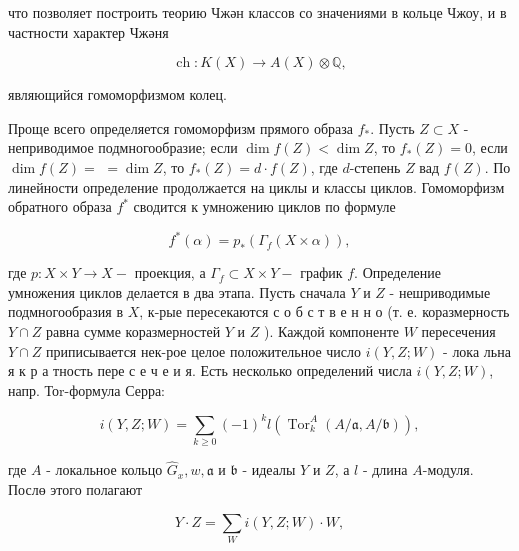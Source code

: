 \documentclass[10pt]{article}
\begin{document}
что позволяет построить теорию Чжән классов со значениями в кольце Чжоу, и в частности характер Чжәня



\[

\operatorname{ch}: K(X) \longrightarrow A(X) \otimes \mathbb{Q},

\]



являющийся гомоморфизмом колец.



Проще всего определяется гомоморфизм прямого образа $f_{*}$. Пусть $Z \subset X$ - неприводимое подмногообразие; если $\operatorname{dim} f(Z)<\operatorname{dim} Z$, то $f_{*}(Z)=0$, если $\operatorname{dim} f(Z)=$ $=\operatorname{dim} Z$, то $f_{*}(Z)=d \cdot f(Z)$, где $d$-степень $Z$ вад $f(Z)$. По линейности определение продолжается на циклы и классы циклов. Гомоморфизм обратного образа $f^{*}$ сводится к умножению циклов по формуле



\[

f^{*}(\alpha)=p_{*}\left(\Gamma_{f}(X \times \alpha)\right),

\]



где $p: X \times Y \rightarrow X-$ проекция, а $\Gamma_{f} \subset X \times Y-$ график $f$. Определение умножения циклов делается в два этапа. Пусть сначала $Y$ и $Z$ - нешриводимые подмногообразия в $X$, к-рые пересекаются с о б с т в е н н о (т. е. коразмерность $Y \cap Z$ равна сумме коразмерностей $Y$ и $Z$ ). Каждой компоненте $W$ пересечения $Y \cap Z$ приписывается нек-рое целое положительное число $i(Y, Z ; W)$ - лока льна я к р а тность пере с е ч е и я. Есть несколько определений числа $i(Y, Z ; W)$, напр. Тоr-формула Серра:



\[

i(Y, Z ; W)=\sum_{k \geqslant 0}(-1)^{k} l\left(\operatorname{Tor}_{k}^{A}(A / \mathfrak{a}, A / \mathfrak{b})\right),

\]



где $A$ - локальное кольцо $\widehat{G}_{x}, w, \mathfrak{a}$ и $\mathfrak{b}$ - идеалы $Y$ и $Z$, а $l$ - длина $A$-модуля. Послө этого полагают



\[

Y \cdot Z=\sum_{W} i(Y, Z ; W) \cdot W,

\]
\end{document}
